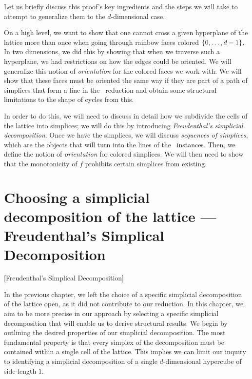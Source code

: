 Let us briefly discuss this proof's key ingredients and the steps we will take to attempt to generalize them to the $d$-dimensional case.

On a high level, we want to show that one cannot cross a given hyperplane of the lattice more than once when going through rainbow faces colored $\left\{0, \dots, d-1\right\}$. In two dimensions, we did this by showing that when we traverse such a hyperplane, we had restrictions on how the edges could be oriented. We will generalize this notion of \emph{orientation} for the colored faces we work with.  We will show that these faces must be oriented the same way if they are part of a path of simplices that form a line in the \EndOfLine\ reduction and obtain some structural limitations to the shape of cycles from this.

In order to do this, we will need to discuss in detail how we subdivide the cells of the lattice into simplices; we will do this by introducing \emph{Freudenthal's simplicial decomposition}. Once we have the simplices, we will discuss \emph{sequences of simplices}, which are the objects that will turn into the lines of the \EndOfLine\ instances. Then, we define the notion of \emph{orientation} for colored simplices. We will then need to show that the monotonicity of $f$ prohibits certain simplices from existing.

\section{Choosing a simplicial decomposition of the lattice --- Freudenthal's Simplical Decomposition}[Freudenthal's Simplical Decomposition]\label{sec:freudenthal_simplicial_decomposition}

In the previous chapter, we left the choice of a specific simplicial decomposition of the lattice open, as it did not contribute to our reduction. In this chapter, we aim to be more precise in our approach by selecting a specific simplicial decomposition that will enable us to derive structural results. We begin by outlining the desired properties of our simplicial decomposition. The most fundamental property is that every simplex of the decomposition must be contained within a single cell of the lattice. This implies we can limit our inquiry to identifying a simplicial decomposition of a single $d$-dimensional hypercube of side-length $1$.

